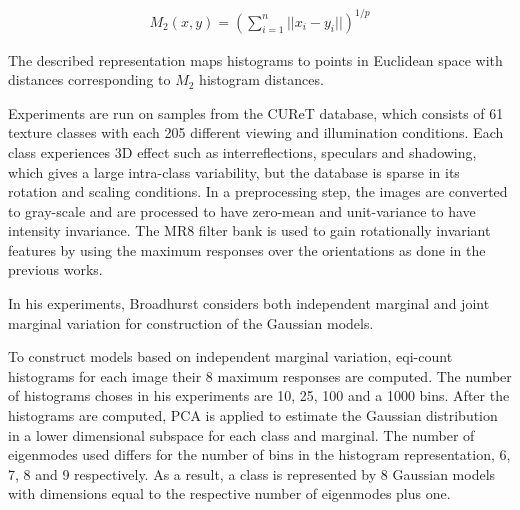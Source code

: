	\begin{eqnarray*}
		M_2(x, y) = (\sum^n_{i=1} ||x_i - y_i||)^{1/p}
	\end{eqnarray*}

The described representation maps histograms to points in Euclidean space with distances corresponding to $M_2$ histogram distances.

Experiments are run on samples from the CUReT database, which consists of 61 texture classes with each 205 different viewing and illumination conditions. Each class experiences 3D effect such as interreflections, speculars and shadowing, which gives a large intra-class variability, but the database is sparse in its rotation and scaling conditions. In a preprocessing step, the images are converted to gray-scale and are processed to have zero-mean and unit-variance to have intensity invariance. The MR8 filter bank is used to gain rotationally invariant features by using the maximum responses over the orientations as done in the previous works.


In his experiments, Broadhurst considers both independent marginal and joint marginal variation for construction of the Gaussian models. 

To construct models based on independent marginal variation, eqi-count histograms for each image their 8 maximum responses are computed. The number of histograms choses in his experiments are 10, 25, 100 and a 1000 bins. After the histograms are computed, PCA is applied to estimate the Gaussian distribution in a lower dimensional subspace for each class and marginal. The number of eigenmodes used differs for the number of bins in the histogram representation, 6, 7, 8 and 9 respectively. As a result, a class is represented by 8 Gaussian models with dimensions equal to the respective number of eigenmodes plus one. 

